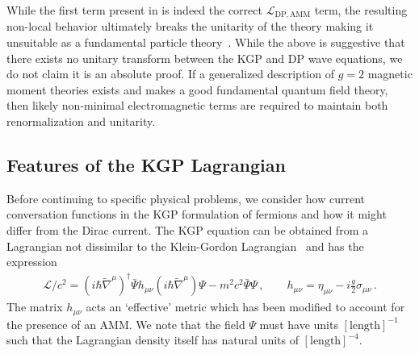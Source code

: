 While the first term present in  is indeed the correct $\mathcal{L}_\mathrm{DP,AMM}$ term, the resulting non-local behavior ultimately breaks the unitarity of the theory making it unsuitable as a fundamental particle theory~\citep{Veltman:1997am}. While the above is suggestive that there exists no unitary transform between the KGP and DP wave equations, we do not claim it is an absolute proof. If a generalized description of $g\!=\!2$ magnetic moment theories exists and makes a good fundamental quantum field theory, then likely non-minimal electromagnetic terms are required to maintain both renormalization and unitarity.

\subsection{Features of the KGP Lagrangian}
\label{sec:lagrangian}
\noindent Before continuing to specific physical problems, we consider how current conversation functions in the KGP formulation of fermions and how it might differ from the Dirac current. The KGP equation can be obtained from a Lagrangian not dissimilar to the Klein-Gordon Lagrangian~\citep{Delgado-Acosta:2010ita} and has the expression
\begin{gather}
\label{lagrangian:1} \mathcal{L}/c^{2}=\left(i\hbar{\widetilde\nabla}^{\mu}\right)^{\dag}\bar{\Psi}h_{\mu\nu}\left(i\hbar{\widetilde\nabla}^{\mu}\right)\Psi-m^{2}c^{2}\bar{\Psi}\Psi\,,\qquad h_{\mu\nu}=\eta_{\mu\nu}-i\frac{g}{2}\sigma_{\mu\nu}\,.
\end{gather}
The matrix $h_{\mu\nu}$ acts an `effective' metric which has been modified to account for the presence of an AMM. We note that the field $\Psi$ must have units $[\mathrm{length}]^{-1}$ such that the Lagrangian density itself has natural units of $[\mathrm{length}]^{-4}$.

